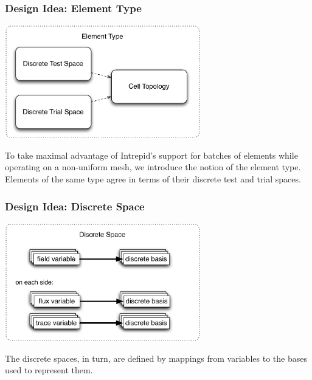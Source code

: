 \documentclass[mathserif]{beamer}
\begin{document}
\begin{frame}
\frametitle{Design Idea: Element Type}

\begin{center}
\includegraphics[width=8.5cm]{ElementType}
\end{center}

To take maximal advantage of Intrepid's support for batches of elements while operating on a non-uniform mesh,
we introduce the notion of the element type.  Elements of the same type agree in terms of their discrete test and trial spaces.

\end{frame}


\begin{frame}
\frametitle{Design Idea: Discrete Space}

\begin{center}
\includegraphics[width=8.5cm]{DiscreteSpace}
\end{center}

The discrete spaces, in turn, are defined by mappings from variables to the bases used to represent them.

\end{frame}
\end{document}

